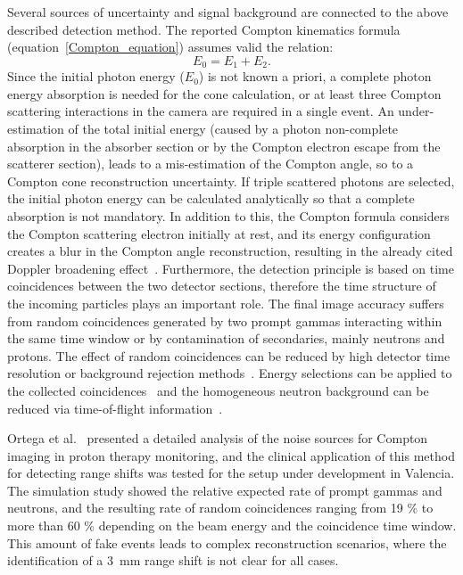 Several sources of uncertainty and signal background are connected to the above described detection method. The reported Compton kinematics formula (equation~\ref{Compton_equation}) assumes valid the relation:
 \begin{equation}
E_{0} = E_{1}+E_{2}.
\label{energy_equation}
\end{equation} 
Since the initial photon energy (\(E_{0}\)) is not known a priori, a complete photon energy absorption is needed for the cone calculation, or at least three Compton scattering interactions in the camera are required in a single event. An under-estimation of the total initial energy (caused by a photon non-complete absorption in the absorber section or by the Compton electron escape from the scatterer section), leads to a mis-estimation of the Compton angle, so to a Compton cone reconstruction uncertainty. If triple scattered photons are selected, the initial photon energy can be calculated analytically so that a complete absorption is not mandatory. In addition to this, the Compton formula considers the Compton scattering electron initially at rest, and its energy configuration creates a blur in the Compton angle reconstruction, resulting in the already cited Doppler broadening effect~\cite{Doppler}. Furthermore, the detection principle is based on time coincidences between the two detector sections, therefore the time structure of the incoming particles plays an important role. The final image accuracy suffers from random coincidences generated by two prompt gammas interacting within the same time window or by contamination of secondaries, mainly neutrons and protons. The effect of random coincidences can be reduced by high detector time resolution or background rejection methods~\cite{Draeger:2017aa}. Energy selections can be applied to the collected coincidences~\cite{Polf:2009aa, Hilaire:2016aa} and the homogeneous neutron background can be reduced via time-of-flight information~\cite{Testa:2010aa}.

Ortega et al.~\cite{Ortega:2015aa} presented a detailed analysis of the noise sources for Compton imaging in proton therapy monitoring, and the clinical application of this method for detecting range shifts was tested for the setup under development in Valencia. The simulation study showed the relative expected rate of prompt gammas and neutrons, and the resulting rate of random coincidences ranging from 19 \% to more than 60 \% depending on the beam energy and the coincidence time window. This amount of fake events leads to complex reconstruction scenarios, where the identification of a 3~mm range shift is not clear for all cases.

